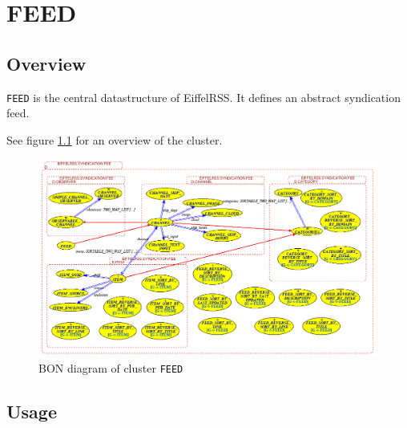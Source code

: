 \part{FEED}

\chapter{Overview}
\label{cha:feed-overview}

\texttt{FEED} is the central datastructure of EiffelRSS. It defines an
abstract syndication feed.

See figure \ref{fig:feed} for an overview of the cluster.

\begin{figure}[htbp]
  \centering
  \includegraphics[width=\textwidth]{./figures/EIFFELRSS_SYNDICATION_FEED}
  \caption{BON diagram of cluster \texttt{FEED}}
  \label{fig:feed}
\end{figure}


\chapter{Usage}
\label{cha:feed-usage}

